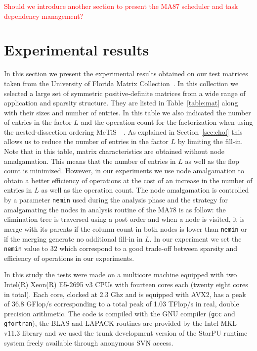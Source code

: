 \documentclass{article}
\newcommand{\alert}[1]{\textcolor{red}{#1}\xspace}
\newcommand{\starpu}{{StarPU}\xspace}
\newcommand{\metis}{{\sc Me$\!$T$\!$iS\ }}
\begin{document}

\alert{Should we introduce another section to present the MA87
  scheduler and task dependency management?}

\section{Experimental results}\label{sec:experiments}

In this section we present the experimental results obtained on our
test matrices taken from the University of Florida Matrix
Collection~\cite{d.h:11}. In this collection we selected a large set
of symmetric positive-definite matrices from a wide range of
application and sparsity structure. They are listed in
Table~\ref{table:mat} along with their sizes and number of entries. In
this table we also indicated the number of entries in the factor $L$
and the operation count for the factorization when using the
nested-dissection ordering \metis~\cite{k.k:98}. As explained in
Section~\ref{sec:chol} this allows us to reduce the number of entries
in the factor $L$ by limiting the fill-in. Note that in this table,
matrix characteristics are obtained without node amalgamation. This
means that the number of entries in $L$ as well as the flop count is
minimized. However, in our experiments we use node amalgamation to
obtain a better efficiency of operations at the cost of an increase in
the number of entries in $L$ as well as the operation count. The node
amalgamation is controlled by a parameter \texttt{nemin} used during
the analysis phase and the strategy for amalgamating the nodes in
analysis routine of the MA78 is as follow: the elimination tree is
traversed using a post order and when a node is visited, it is merge
with its parents if the column count in both nodes is lower than
\texttt{nemin} or if the merging generate no additional fill-in in
$L$. In our experiment we set the \texttt{nemin} value to $32$ which
correspond to a good trade-off between sparsity and efficiency of
operations in our experiments.

In this study the tests were made on a multicore machine equipped with
two Intel(R) Xeon(R) E5-2695 v3 CPUs with fourteen cores each (twenty
eight cores in total). Each core, clocked at 2.3 Ghz and is equipped
with AVX2, has a peak of 36.8 GFlop/s corresponding to a total peak of
1.03 TFlop/s in real, double precision arithmetic. The code is
compiled with the GNU compiler (\texttt{gcc} and \texttt{gfortran}),
the BLAS and LAPACK routines are provided by the Intel MKL v11.3
library and we used the trunk development version of the \starpu
runtime system freely available through anonymous SVN access.
\end{document}
